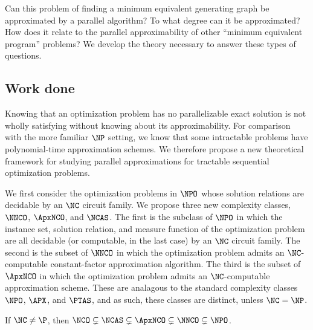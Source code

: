 \documentclass{article}
\begin{document}
Can this problem of finding a minimum equivalent generating graph be approximated by a parallel algorithm?
To what degree can it be approximated?
How does it relate to the parallel approximability of other ``minimum equivalent program'' problems?
We develop the theory necessary to answer these types of questions.

\subsection{Work done}


Knowing that an optimization problem has no parallelizable exact solution is not wholly satisfying without knowing about its approximability.
For comparison with the more familiar $\NP$ setting, we know that some intractable problems have polynomial-time approximation schemes.
We therefore propose a new theoretical framework for studying parallel approximations for tractable sequential optimization problems. %

We first consider the optimization problems in $\NPO$ whose solution relations are decidable by an $\NC$ circuit family.
We propose three new complexity classes, $\NNCO$, $\ApxNCO$, and $\NCAS$.
The first is the subclass of $\NPO$ in which the instance set, solution relation, and measure function of the optimization problem are all decidable (or computable, in the last case) by an $\NC$ circuit family.
The second is the subset of $\NNCO$ in which the optimization problem admits an $\NC$-computable constant-factor approximation algorithm.
The third is the subset of $\ApxNCO$ in which the optimization problem admits an $\NC$-computable approximation scheme.
These are analagous to the standard complexity classes $\NPO$, $\APX$, and $\PTAS$, and as such, these classes are distinct, unless $\NC = \NP$.

\begin{theorem}
  If $\NC \neq \P$, then
  $\NCO \subsetneq \NCAS \subsetneq \ApxNCO \subsetneq \NNCO \subsetneq \NPO$.
\end{theorem}
\end{document}
